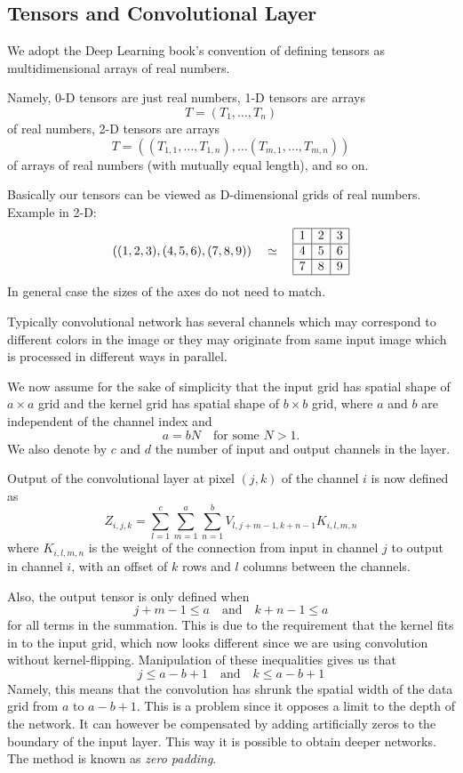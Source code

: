 \documentclass[]{article}
\begin{document}
\subsection{Tensors and Convolutional Layer}
We adopt the Deep Learning book's convention of defining tensors as
multidimensional arrays of real numbers.

Namely, 0-D tensors are just real numbers, 1-D tensors are arrays
\[
T = (T_1, \ldots, T_n)
\]
of real numbers, 2-D tensors are arrays
\[
T = ((T_{1,1}, \ldots, T_{1,n}), \ldots (T_{m,1}, \ldots, T_{m,n}))
\]
of arrays of real numbers (with mutually equal length), and so on.

Basically our tensors can be viewed as D-dimensional grids of real numbers.
Example in 2-D:
\[
((1, 2, 3), (4, 5, 6), (7, 8, 9)) \quad \simeq \quad
\begin{array}{|c|c|c|}
  \hline
  1 & 2 & 3 \\
  \hline
  4 & 5 & 6 \\
  \hline
  7 & 8 & 9 \\
  \hline
\end{array}
\]
In general case the sizes of the axes do not need to match.

Typically convolutional network has several channels which may correspond to different
colors in the image or they may originate from same input image which is processed
in different ways in parallel.

We now assume for the sake of simplicity that the input grid has spatial shape of
$a \times a$ grid and the kernel grid has spatial shape of $b \times b$ grid, where
$a$ and $b$ are independent of the channel index and
\[
a = b N \quad \text{for some $N > 1$}.
\]
We also denote by $c$ and $d$ the number of input and output channels in the layer.

Output of the convolutional layer at pixel $(j, k)$ of the channel $i$ is now
defined as
\[
Z_{i, j, k} = \sum_{l=1}^c \sum_{m = 1}^a \sum_{n=1}^b
V_{l, j + m -1, k + n -1} K_{i, l, m, n}
\]
where $K_{i, l, m, n}$ is the weight of the connection from input in channel $j$
to output in channel $i$, with an offset of $k$ rows and $l$ columns between the
channels.

Also, the output tensor is only defined when
\[
j + m - 1 \le a \quad \text{and} \quad k + n - 1 \le a
\]
for all terms in the summation. This is due to the requirement that the kernel fits
in to the input grid, which now looks different since we are using convolution
without kernel-flipping. Manipulation of these inequalities gives us that
\[
 j \le a - b + 1\quad \text{and} \quad  k \le a - b + 1
\]
Namely, this means that the convolution has shrunk the spatial width of the data grid
from $a$ to $a - b + 1$. This is a problem since it opposes a limit to the depth of
the network. It can however be compensated by adding artificially zeros to the
boundary of the input layer. This way it is possible to obtain deeper networks. The
method is known as \emph{zero padding}.
\end{document}
